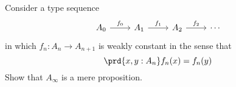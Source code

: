 \begin{exercises}
\item Consider a type sequence
\begin{equation*}
\begin{tikzcd}
A_0 \arrow[r,"f_0"] & A_1 \arrow[r,"f_1"] & A_2 \arrow[r,"f_2"] & \cdots
\end{tikzcd}
\end{equation*}
in which $f_n:A_n\to A_{n+1}$ is weakly constant in the sense that
\begin{equation*}
\prd{x,y:A_n} f_n(x)=f_n(y)
\end{equation*}
Show that $A_\infty$ is a mere proposition.
\end{exercises}
